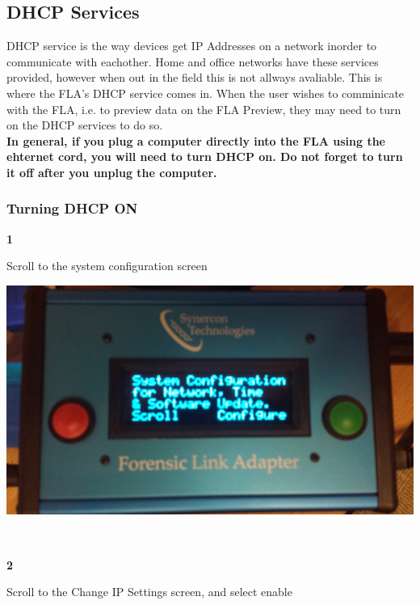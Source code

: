 \documentclass[11pt]{article}
\begin{document}
\subsection{DHCP Services}
\label{subsec:dhcp_services}
DHCP service is the way devices get IP Addresses on a network inorder to communicate with eachother. Home and office networks have these services provided, however when out in the field this is not allways avaliable. This is where the FLA's DHCP service comes in. When the user wishes to comminicate with the FLA, i.e. to preview data on the FLA Preview, they may need to turn on the DHCP services to do so.\\
\textbf{In general, if you plug a computer directly into the FLA using the ehternet cord, you will need to turn DHCP on. Do not forget to turn it off after you unplug the computer.}
\subsubsection{Turning DHCP ON}
\noindent\begin{minipage}{0.3\textwidth}%
\begin{center}
\textbf{1}\\[\baselineskip]
\end{center}
Scroll to the system configuration screen
\end{minipage}%
\hfill%
\begin{minipage}{0.6\textwidth}
\includegraphics[width=\linewidth]{../media/fla_screens/sys_conf}
\end{minipage}
\\[\baselineskip]
\noindent\begin{minipage}{0.3\textwidth}%
\begin{center}
\textbf{2}\\[\baselineskip]
\end{center}
Scroll to the Change IP Settings screen, and select enable
\end{minipage}%
\end{document}
